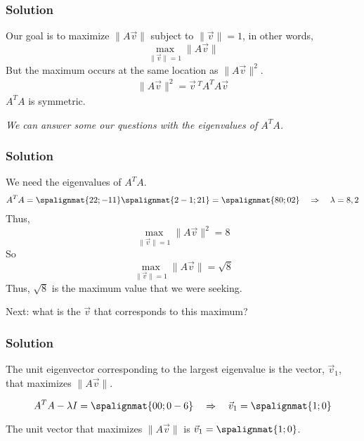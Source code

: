 \begin{frame} \frametitle{Solution}

    Our goal is to maximize $\lVert A\vec v \rVert$ subject to $\lVert \vec v \rVert = 1$, in other words, 
    $$\max_{\lVert \vec v \rVert = 1}\lVert A\vec v \rVert$$
    \pause But the maximum occurs at the same location as $\lVert A\vec v \rVert^2$. 
    \begin{align*}
        \lVert A\vec v \rVert^2 = \vec v\,^T A^TA \vec v
    \end{align*}
    \pause
    $A^TA$ is symmetric.
    
    \pause 
    \vspace{12pt}
    \textit{We can answer some our questions with the eigenvalues of $A^TA$. }
\end{frame}



\begin{frame} \frametitle{Solution}
    We need the eigenvalues of $A^TA$. 
    \begin{align*}
        A^TA  = \spalignmat{2 2;-1 1}\spalignmat{2 -1;2 1} = \spalignmat{8 0;0 2} \quad \Rightarrow \quad \lambda = 8, 2
    \end{align*}
    Thus, 
    $$\max_{\lVert \vec v \rVert = 1}\lVert A\vec v \rVert^2 = 8$$
    So
    $$\max_{\lVert \vec v \rVert = 1}\lVert A\vec v \rVert = \sqrt8$$
    Thus, $\sqrt8$ is the maximum value that we were seeking. 
    
    \vspace{12pt}
    
    Next: what is the $\vec v$ that corresponds to this maximum? 

\end{frame}



\begin{frame} \frametitle{Solution}
    The unit eigenvector corresponding to the largest eigenvalue is the vector, $\vec v_1$, that maximizes $\lVert A\vec v \rVert$. 
    
    $$A^TA - \lambda I = \spalignmat{0 0;0 -6} \quad \Rightarrow \quad \vec v_1 = \spalignmat{1;0}$$
    
    The unit vector that maximizes $\lVert A\vec v \rVert$ is $\vec v_1 = \spalignmat{1;0}$.
\end{frame}



